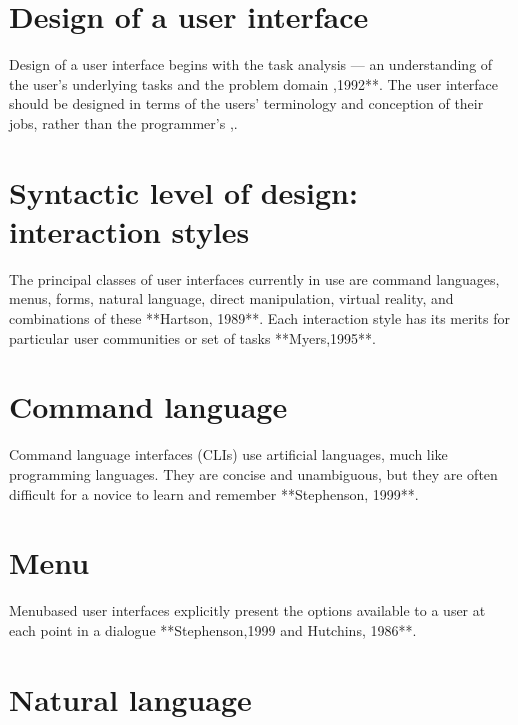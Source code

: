 \documentclass[norsk]{ifimaster}
\title{}
\author{Johannes Akse}
\begin{document}
\maketitle{}

\tableofcontents
\nocite{*}
\section{Design of a user interface}

Design of a user interface begins with the task analysis --- an
understanding of the user's underlying tasks and the problem 
domain \parencite{shneiderman1992},1992**. The user interface should be 
designed in terms of the users' terminology and conception of 
their jobs, rather than the programmer's \parencite{shneiderman1983}\parencite{stephenson1999,hutchins1986},.

\section{Syntactic level of design: interaction styles}

The principal classes of user interfaces currently in use are
command languages, menus, forms, natural language, direct manipulation,
virtual reality, and combinations of these **Hartson, 1989**. Each
interaction style has its merits for particular user communities or
set of tasks **Myers,1995**.

\section{Command language}

Command language interfaces (CLIs) use artificial languages, 
much like programming languages. They are concise and unambiguous, 
but they are often difficult for a novice to learn and remember 
**Stephenson, 1999**.

\section{Menu}

Menubased user interfaces explicitly present the options available to
a user at each point in a dialogue **Stephenson,1999 and Hutchins,
1986**. 

\section{Natural language}
\end{document}
